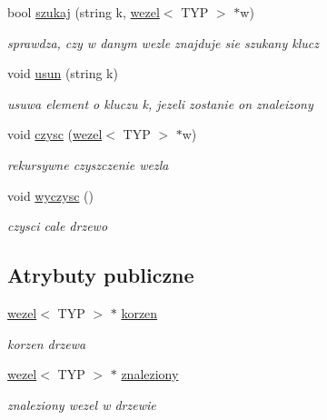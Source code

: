 \begin{DoxyCompactItemize}
bool \hyperlink{classdrzewo_a2670c642c8edfef4a716c39a3dd626a7}{szukaj} (string k, \hyperlink{classwezel}{wezel}$<$ \-T\-Y\-P $>$ $\ast$w)
\begin{DoxyCompactList}\small\item\em sprawdza, czy w danym wezle znajduje sie szukany klucz \end{DoxyCompactList}\item 
void \hyperlink{classdrzewo_ad80b0276f6f4ed01fb2b42856e62f101}{usun} (string k)
\begin{DoxyCompactList}\small\item\em usuwa element o kluczu k, jezeli zostanie on znaleizony \end{DoxyCompactList}\item 
void \hyperlink{classdrzewo_a52496982e5ad7f4002d343e3637a68da}{czysc} (\hyperlink{classwezel}{wezel}$<$ \-T\-Y\-P $>$ $\ast$w)
\begin{DoxyCompactList}\small\item\em rekursywne czyszczenie wezla \end{DoxyCompactList}\item 
void \hyperlink{classdrzewo_a25de98ca343edbc949466d3b6cd5ce9f}{wyczysc} ()
\begin{DoxyCompactList}\small\item\em czysci cale drzewo \end{DoxyCompactList}\end{DoxyCompactItemize}
\subsection*{\-Atrybuty publiczne}
\begin{DoxyCompactItemize}
\item 
\hyperlink{classwezel}{wezel}$<$ \-T\-Y\-P $>$ $\ast$ \hyperlink{classdrzewo_a8c5c1104e4e6e327ffe7091e96528bf5}{korzen}
\begin{DoxyCompactList}\small\item\em korzen drzewa \end{DoxyCompactList}\item 
\hyperlink{classwezel}{wezel}$<$ \-T\-Y\-P $>$ $\ast$ \hyperlink{classdrzewo_a5c5ca950d7ee79f135c50bd33dba3745}{znaleziony}
\begin{DoxyCompactList}\small\item\em znaleziony wezel w drzewie \end{DoxyCompactList}\end{DoxyCompactItemize}


